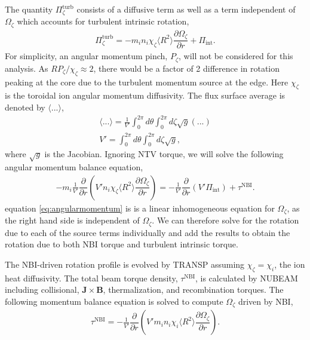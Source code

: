 \documentclass[aip, pop, preprint]{revtex4-1}
\numberwithin{figure}{section}
\numberwithin{equation}{section}
\newcommand{\partder}[2]{\dfrac{\partial  #1}{\partial  #2}} %
\begin{document}
The quantity $\Pi_{\zeta}^{\mathrm{turb}}$ consists of a diffusive term as well as a term independent of $\Omega_{\zeta}$ which accounts for turbulent intrinsic rotation, 
\begin{gather}
\Pi_{\zeta}^{\mathrm{turb}} = -m_i n_i \chi_{\zeta} \langle R^2 \rangle \partder{\Omega_{\zeta}}{r} + \Pi_{\mathrm{int}}.
\end{gather}
For simplicity, an angular momentum pinch, $P_{\zeta}$, will not be considered for this analysis. As $R P_{\zeta}/\chi_{\zeta} \approx 2$, there would be a factor of 2 difference in rotation peaking at the core due to the turbulent momentum source at the edge.\cite{LeeThesis} Here $\chi_{\zeta}$ is the toroidal ion angular momentum diffusivity. The flux surface average is denoted by $\langle ... \rangle$,
\begin{gather}
\langle ... \rangle = \frac{1}{V'} \int_0^{2 \pi} d \theta \int_0^{2 \pi} d \zeta \sqrt{g} (...)
\\ V' = \int_0^{2\pi} d \theta \int_0^{2 \pi} d \zeta \sqrt{g},
\end{gather}
where $\sqrt{g}$ is the Jacobian.
Ignoring NTV torque, we will solve the following angular momentum balance equation,
\begin{gather}
-m_i \frac{1}{V'} \partder{}{r} \left( V' n_i \chi_{\zeta} \langle R^2 \rangle \partder{\Omega_{\zeta}}{r} \right) =  -\frac{1}{V'} \partder{}{r} \left( V' \Pi_{\mathrm{int}} \right) + \tau^{\mathrm{NBI}}.
\label{eq:angularmomentum}
\end{gather}
equation \ref{eq:angularmomentum} is is a linear inhomogeneous equation for $\Omega_{\zeta}$, as the right hand side is independent of $\Omega_{\zeta}$. We can therefore solve for the rotation due to each of the source terms individually and add the results to obtain the rotation due to both NBI torque and turbulent intrinsic torque. 

The NBI-driven rotation profile is evolved by TRANSP assuming $\chi_{\zeta} = \chi_{i}$, the ion heat diffusivity. The total beam torque density, $\tau^{\mathrm{NBI}}$, is calculated by NUBEAM including collisional, $\bm{J} \times \bm{B}$, thermalization, and recombination torques. The following momentum balance equation is solved to compute $\Omega_{\zeta}$ driven by NBI,
\begin{gather}
\tau^{\mathrm{NBI}} = -\frac{1}{V'} \partder{}{r} \left( V' m_i n_i \chi_{i} \langle R^2 \rangle \partder{\Omega_{\zeta}}{r} \right).
\end{gather} 
\end{document}
